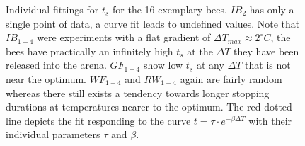 \begin{figure}%
    \centering
    \caption{Individual fittings for $t_{s}$ for the 16 exemplary bees. $IB_{2}$ has only a single point of data, a curve fit leads to undefined values. Note that $IB_{1-4}$ were experiments with a flat gradient of $\Delta T_{max} \approx 2^{\circ} C$, the bees have practically an infinitely high $t_{s}$ at the $\Delta T$ they have been released into the arena. $GF_{1-4}$ show low $t_{s}$ at any $\Delta T$ that is not near the optimum. $WF_{1-4}$ and $RW_{1-4}$ again are fairly random whereas there still exists a tendency towards longer stopping durations at temperatures nearer to the optimum. The red dotted line depicts the fit responding to the curve $t = \tau \cdot e^{-\beta \Delta T}$ with their individual parameters $\tau$ and $\beta$.} 
    \label{fig:t_stopping_nonlin_16}
\end{figure}

